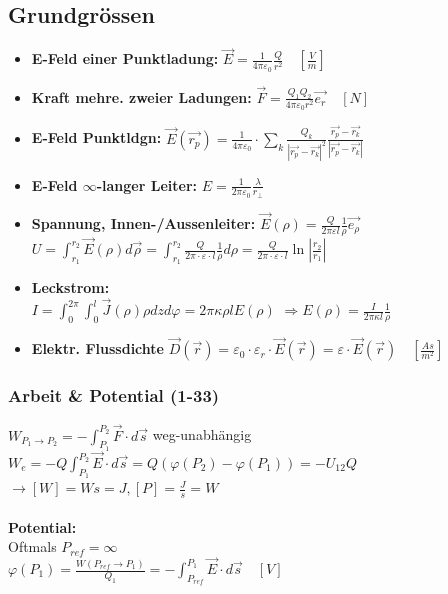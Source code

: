 \documentclass[a4paper, 6pt, landscape]{scrartcl}
\newcommand{\dis}[1]{\hspace{#1cm}}
\begin{document}
\begin{multicols*}{4}
				\subsection{Grundgrössen}
				\begin{itemize}
					\item \textbf{E-Feld einer Punktladung:} $\vec{E}=\frac{1}{4\pi\varepsilon_0}\frac{Q}{r^2} \quad [\frac{V}{m}]$
					\item \textbf{Kraft mehre. zweier Ladungen:} $\vec{F}=\frac{Q_1Q_2}{4\pi\varepsilon_0r^2}\vec{e_r} \quad [N]$
					\item \textbf{E-Feld Punktldgn:}
					$\vec{E}(\vec{r_p})=\frac{1}{4\pi\varepsilon_0}\cdot\sum_k\frac{Q_k}{|\vec{r_p}-\vec{r_k}|^2}\frac{\vec{r_p}-\vec{r_k}}{|\vec{r_p}-\vec{r_k}|}$
					\item \textbf{E-Feld $\infty$-langer Leiter:} $E=\frac{1}{2\pi\varepsilon_0}\frac{\lambda}{r_\bot}$
					\item \textbf{Spannung, Innen-/Aussenleiter:} $\vec{E}(\rho)=\frac{Q}{2\pi\varepsilon l}\frac{1}{\rho}\vec{e_{\rho}}$\\
					$\displaystyle{U=\int_{r_1}^{r_2}{\vec{E}(\rho)}d\vec{\rho}=\int_{r_1}^{r_2}{\frac{Q}{2\pi\cdot\varepsilon\cdot l}\frac{1}{\rho}}d\rho}=\frac{Q}{2\pi\cdot\varepsilon\cdot l}\ln{\left| \frac{r_2}{r_1} \right|}$\\
					\item \textbf{Leckstrom:}
					\\ $\displaystyle{I=\int_{0}^{2\pi}{\int_{0}^{l}{\vec{J}(\rho)\rho}dz}d\varphi=2\pi\kappa\rho
					 l E(\rho)}$  $\Rightarrow E(\rho)=\frac{I}{2\pi\kappa l}\frac{1}{\rho}$
					 \item \textbf{Elektr. Flussdichte }$\vec{D}(\vec{r})=\varepsilon_0\cdot\varepsilon_r\cdot\vec{E}(\vec{r})=\varepsilon\cdot\vec{E}(\vec{r})\quad [\frac{As}{m^2}]$
				\end{itemize}

				\subsubsection{Arbeit \& Potential (1-33)}
				$W_{P_1\rightarrow P_2}=-\int_{P_1}^{P_2}{\vec{F}\cdot}d\vec{s}$ \dis{0.5} weg-unabhängig\\
				$W_{e}=-Q\int_{P_1}^{P_2}{\vec{E}\cdot}d\vec{s}=Q\left(\varphi(P_2)-\varphi(P_1)\right)=-U_{12}Q$\\
				$\rightarrow [W]=Ws=J, [P]=\frac{J}{s}=W$\\ \\
				\textbf{Potential:}\\
				Oftmals $P_{ref}=\infty$\\
				$\varphi(P_1)=\frac{W(P_{ref}\rightarrow P_1)}{Q_1}=-\int_{P_{ref}}^{P_1}{\vec{E}\cdot}d\vec{s} \quad [V]$

\end{multicols*}
\end{document}
